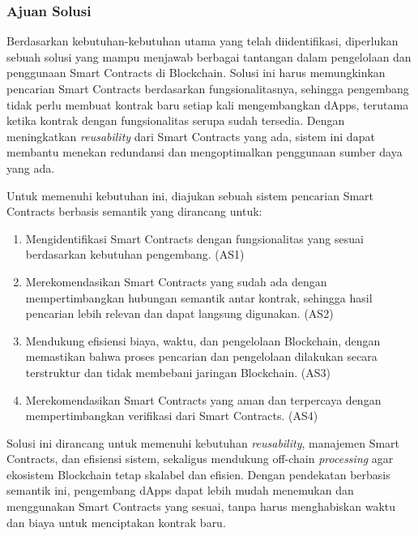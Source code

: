 \subsubsection{Ajuan Solusi}
\label{subsubsec:ajuan-solusi}

Berdasarkan kebutuhan-kebutuhan utama yang telah diidentifikasi, diperlukan sebuah solusi yang mampu menjawab berbagai tantangan dalam pengelolaan dan penggunaan Smart Contracts di Blockchain. Solusi ini harus memungkinkan pencarian Smart Contracts berdasarkan fungsionalitasnya, sehingga pengembang tidak perlu membuat kontrak baru setiap kali mengembangkan dApps, terutama ketika kontrak dengan fungsionalitas serupa sudah tersedia. Dengan meningkatkan \textit{reusability} dari Smart Contracts yang ada, sistem ini dapat membantu menekan redundansi dan mengoptimalkan penggunaan sumber daya yang ada.

Untuk memenuhi kebutuhan ini, diajukan sebuah sistem pencarian Smart Contracts berbasis semantik yang dirancang untuk:

% 

\begin{enumerate}
  \item Mengidentifikasi Smart Contracts dengan fungsionalitas yang sesuai berdasarkan kebutuhan pengembang. (AS1)
  \item Merekomendasikan Smart Contracts yang sudah ada dengan mempertimbangkan hubungan semantik antar kontrak, sehingga hasil pencarian lebih relevan dan dapat langsung digunakan. (AS2)
  \item Mendukung efisiensi biaya, waktu, dan pengelolaan Blockchain, dengan memastikan bahwa proses pencarian dan pengelolaan dilakukan secara terstruktur dan tidak membebani jaringan Blockchain. (AS3)
  \item Merekomendasikan Smart Contracts yang aman dan terpercaya dengan mempertimbangkan verifikasi dari Smart Contracts. (AS4)
\end{enumerate}

Solusi ini dirancang untuk memenuhi kebutuhan \textit{reusability}, manajemen Smart Contracts, dan efisiensi sistem, sekaligus mendukung off-chain \textit{processing} agar ekosistem Blockchain tetap skalabel dan efisien. Dengan pendekatan berbasis semantik ini, pengembang dApps dapat lebih mudah menemukan dan menggunakan Smart Contracts yang sesuai, tanpa harus menghabiskan waktu dan biaya untuk menciptakan kontrak baru.